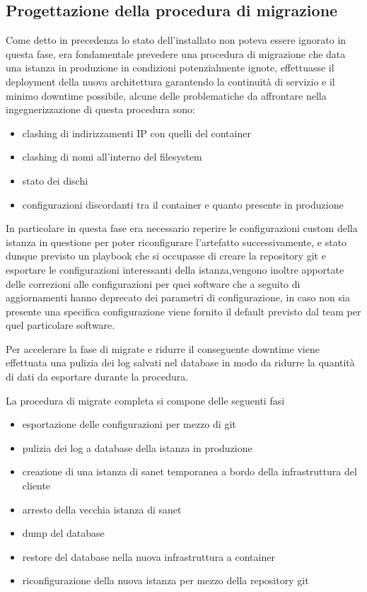 \subsection{Progettazione della procedura di migrazione}
Come detto in precedenza lo stato dell'installato non poteva essere ignorato in questa fase, era fondamentale prevedere una procedura di migrazione che data una istanza in produzione in condizioni potenzialmente ignote, effettuasse il deployment della nuova architettura garantendo la continuità di servizio e il minimo downtime possibile, alcune delle problematiche da affrontare nella ingegnerizzazione di questa procedura sono:

\begin{itemize}
  \item{clashing di indirizzamenti IP con quelli del container}
  \item{clashing di nomi all'interno del filesystem}
  \item{stato dei dischi}
  \item{configurazioni discordanti tra il container e quanto presente in produzione}
\end{itemize}

In particolare in questa fase era necessario reperire le configurazioni custom della istanza in questione per poter riconfigurare l'artefatto successivamente, e stato dunque previsto un playbook che si occupasse di creare la repository git e esportare le configurazioni interessanti della istanza,vengono inoltre apportate delle correzioni alle configurazioni per quei software che a seguito di aggiornamenti hanno deprecato dei parametri di configurazione, in caso non sia presente una specifica configurazione viene fornito il default previsto dal team per quel particolare software.

Per accelerare la fase di migrate e ridurre il conseguente downtime viene effettuata una pulizia  dei log salvati nel database in modo da ridurre la quantità di dati da esportare durante la procedura.

La procedura di migrate completa si compone delle seguenti fasi

\begin{itemize}
  \item{esportazione delle configurazioni per mezzo di git}
  \item{pulizia dei log a database della istanza in produzione}
  \item{creazione di una istanza di sanet temporanea a bordo della infrastruttura del cliente}
  \item{arresto della vecchia istanza di sanet}
  \item{dump del database}
  \item{restore del database nella nuova infrastruttura a container}
  \item{riconfigurazione della nuova istanza per mezzo della repository git}
\end{itemize}

